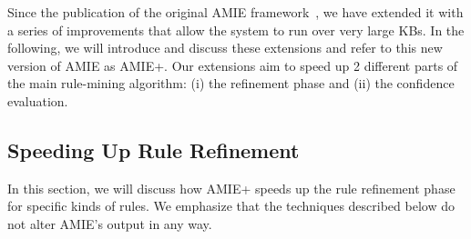 Since the publication of the original AMIE framework~\cite{amie}, we have extended it with a series of improvements 
that allow the system to run over very large KBs. 
In the following, we will introduce and discuss these extensions and refer to this new version of AMIE as AMIE+.
Our extensions aim to speed up 2 different parts of the main rule-mining algorithm: (i) the refinement phase and 
(ii) the confidence evaluation. 







\subsection{Speeding Up Rule Refinement}
\label{subsec:lossless}
In this section, we will discuss how AMIE+ speeds up the rule refinement phase for specific kinds of rules.
We emphasize that the techniques described below do not alter AMIE's output in any way. 

